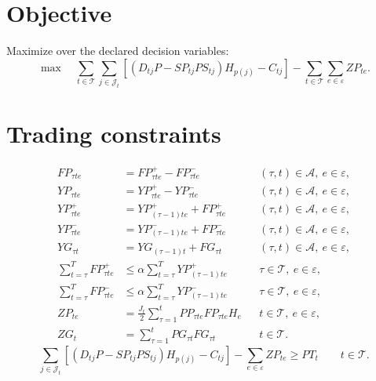 \documentclass[11pt,a4paper]{article}
\begin{document}
\section*{Objective}
Maximize over the declared decision variables:
\begin{equation}
\max\quad
\sum_{t\in\mathcal T}\sum_{j\in\mathcal J_t}
\left[(D_{tj}P-SP_{tj}PS_{tj})H_{p(j)}-C_{tj}\right]
-\sum_{t\in\mathcal T}\sum_{e\in\varepsilon}ZP_{te}.
\tag{24}
\end{equation}

\section*{Trading constraints}
\begin{align}
FP_{\tau te}&=FP_{\tau te}^{+}-FP_{\tau te}^{-}
&& (\tau,t)\in\mathcal A,\ e\in\varepsilon,\tag{1}\\
YP_{\tau te}&=YP_{\tau te}^{+}-YP_{\tau te}^{-}
&& (\tau,t)\in\mathcal A,\ e\in\varepsilon,\tag{2}\\
YP_{\tau te}^{+}&=YP_{(\tau-1)te}^{+}+FP_{\tau te}^{+}
&& (\tau,t)\in\mathcal A,\ e\in\varepsilon,\tag{3}\\
YP_{\tau te}^{-}&=YP_{(\tau-1)te}^{-}+FP_{\tau te}^{-}
&& (\tau,t)\in\mathcal A,\ e\in\varepsilon,\tag{4}\\
YG_{\tau t}&=YG_{(\tau-1)t}+FG_{\tau t}
&& (\tau,t)\in\mathcal A,\ e\in\varepsilon,\tag{5}\\
\sum_{t=\tau}^{T}FP_{\tau te}^{+}
&\le\alpha\sum_{t=\tau}^{T}YP_{(\tau-1)te}^{+}
&& \tau\in\mathcal T,\ e\in\varepsilon,\tag{6}\\
\sum_{t=\tau}^{T}FP_{\tau te}^{-}
&\le\alpha\sum_{t=\tau}^{T}YP_{(\tau-1)te}^{-}
&& \tau\in\mathcal T,\ e\in\varepsilon,\tag{7}\\
ZP_{te}&=\frac{J_t}{2}\sum_{\tau=1}^{t}PP_{\tau te}FP_{\tau te}H_e
&&t\in\mathcal T,\ e\in\varepsilon,\tag{8}\\
ZG_t&=\sum_{\tau=1}^{t}PG_{\tau t}FG_{\tau t}
&&t\in\mathcal T.\tag{9}
\end{align}
\begin{equation}
\sum_{j\in\mathcal J_t}
\left[(D_{tj}P-SP_{tj}PS_{tj})H_{p(j)}-C_{tj}\right]
-\sum_{e\in\varepsilon}ZP_{te}\ge PT_t
\qquad t\in\mathcal T.
\tag{10}
\end{equation}
\end{document}
